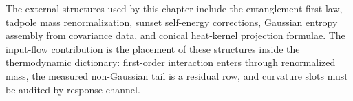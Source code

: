 \begin{principle}
\label{prin:innovation-input-interaction-correspondence-ledger}
The external structures used by this chapter include the entanglement first
law, tadpole mass renormalization, sunset self-energy corrections, Gaussian
entropy assembly from covariance data, and conical heat-kernel projection
formulae. The input-flow contribution is the placement of these structures
inside the thermodynamic dictionary: first-order interaction enters through
renormalized mass, the measured non-Gaussian tail is a residual row, and
curvature slots must be audited by response channel.
\end{principle}

